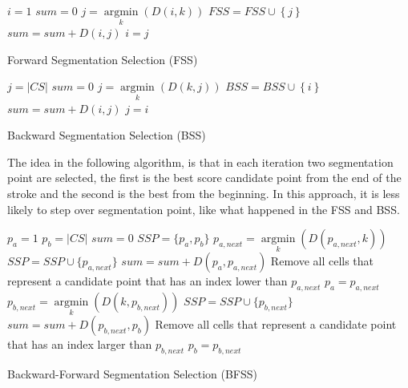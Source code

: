 \documentclass[journal,compsoc]{IEEEtran}
\begin{document}

\begin{algorithm}
$i=1$\;
$sum=0$\;
{
	$j = \mathop {\arg \min }\limits_k \left( {D\left( {i,k} \right)} \right)$\;
	$FSS = FSS \cup \left\{ j \right\}$\;
	$sum = sum + D\left( {i,j} \right)$\;
	$i=j$\;
}
\caption{Forward Segmentation Selection (FSS)}
\label{alg:fss}
\end{algorithm}



\begin{algorithm}
$j={|CS|}$\;
$sum=0$\;
{
	$j = \mathop {\arg \min }\limits_k \left( {D\left( {k,j} \right)} \right)$\;
	$BSS = BSS \cup \left\{ i \right\}$\;
	$sum = sum + D\left( {i,j} \right)$\;
	$j=i$\;
}
\caption{Backward Segmentation Selection (BSS)}
\label{alg:bss}
\end{algorithm}

The idea in the following algorithm, is that in each iteration two segmentation point are selected, the first is the best score candidate point from the end of the stroke and the second is the best from the beginning. In this approach, it is less likely to step over segmentation point, like what happened in the FSS and BSS.

\begin{algorithm}
$p_{a}=1$\;
$p_{b}=|CS|$\;
$sum=0$\;
$SSP=\{p_{a},p_{b}\}$\;
{
	$p_{a,next} = \mathop {\arg \min}\limits_k (D(p_{a,next},k))$\;
	$SSP = SSP \cup \{p_{a,next}\}$\;
	$sum = sum + D(p_a,p_{a,next})$\;
	Remove all cells that represent a candidate point that has an index lower than $p_{a,next}$\;
	$p_{a}=p_{a,next}$\;
	$p_{b,next} = \mathop {\arg \min}\limits_k (D(k,p_{b,next}))$\;
	$SSP = SSP \cup \{p_{b,next}\}$\;
	$sum = sum + D(p_{b,next},p_b)$\;
	Remove all cells that represent a candidate point that has an index larger than  $p_{b,next}$\;
	$p_{b}=p_{b,next}$\;
}
\caption{Backward-Forward Segmentation Selection (BFSS)}
\label{alg:bfss}
\end{algorithm}
\end{document}
